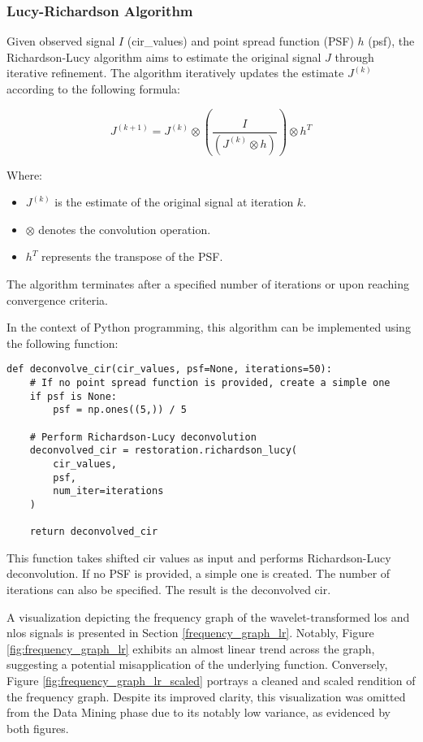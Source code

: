 \subsubsection{Lucy-Richardson Algorithm}

Given observed signal $I$ (cir\_values) and point spread function (PSF) $h$ (psf), the Richardson-Lucy algorithm aims to estimate the original signal $J$ through iterative refinement. The algorithm iteratively updates the estimate $J^{(k)}$ according to the following formula:

\begin{equation}
J^{(k+1)} = J^{(k)} \otimes \left( \frac{I}{(J^{(k)} \otimes h)} \right) \otimes h^T
\end{equation}

Where:
\begin{itemize}
    \item $J^{(k)}$ is the estimate of the original signal at iteration $k$.
    \item $\otimes$ denotes the convolution operation.
    \item $h^T$ represents the transpose of the PSF. 
\end{itemize}


The algorithm terminates after a specified number of iterations or upon reaching convergence criteria.

In the context of Python programming, this algorithm can be implemented using the following function:

\begin{verbatim}
def deconvolve_cir(cir_values, psf=None, iterations=50):
    # If no point spread function is provided, create a simple one
    if psf is None:
        psf = np.ones((5,)) / 5

    # Perform Richardson-Lucy deconvolution
    deconvolved_cir = restoration.richardson_lucy(
        cir_values, 
        psf, 
        num_iter=iterations
    )

    return deconvolved_cir
\end{verbatim}

This function takes shifted \acrshort{cir} values as input and performs Richardson-Lucy deconvolution. If no PSF is provided, a simple one is created. The number of iterations can also be specified. The result is the deconvolved \acrshort{cir}.

A visualization depicting the frequency graph of the wavelet-transformed \acrshort{los} and \acrshort{nlos} signals is presented in Section \ref{frequency_graph_lr}. Notably, Figure \ref{fig:frequency_graph_lr} exhibits an almost linear trend across the graph, suggesting a potential misapplication of the underlying function. Conversely, Figure \ref{fig:frequency_graph_lr_scaled} portrays a cleaned and scaled rendition of the frequency graph. Despite its improved clarity, this visualization was omitted from the Data Mining phase due to its notably low variance, as evidenced by both figures.

